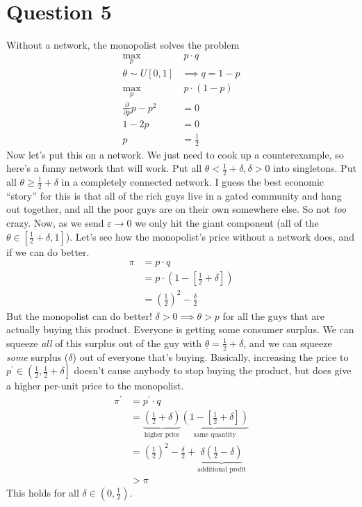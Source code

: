 \section*{Question 5}
Without a network, the monopolist solves the problem
\begin{align*}
  \max_{p} &\ p \cdot q \tag{Assume $mc = 0$}\\
  \theta \sim U[0, 1] &\implies q  = 1 - p\\
  \max_p &\ p \cdot (1 - p)\\
  \frac{\partial}{\partial p} p - p^2 &= 0 \tag{FOC}\\
  1 - 2p &= 0\\
  p &= \frac{1}{2}
\end{align*}
Now let's put this on a network. We just need to cook up a counterexample, so here's a funny network that will work. Put all $\theta < \frac{1}{2} + \delta, \delta > 0$ into singletons. Put all $\theta \ge \frac{1}{2} + \delta$ in a completely connected network. I guess the best economic ``story'' for this is that all of the rich guys live in a gated community and hang out together, and all the poor guys are on their own somewhere else. So not \emph{too} crazy. Now, as we send $\varepsilon \to 0$ we only hit the giant component (all of the $\theta \in \left[\frac{1}{2} + \delta, 1\right]$). Let's see how the monopolist's price without a network does, and if we can do better.
\begin{align*}
  \pi &= p \cdot q\\
      &= p \cdot \left(1 - \left[\frac{1}{2} + \delta\right]\right)\\
  &= \left(\frac{1}{2}\right)^2 - \frac{\delta}{2}
\end{align*}
But the monopolist can do better! $\delta > 0 \implies \theta > p $ for all the guys that are actually buying this product. Everyone is getting some consumer surplus. We can squeeze \emph{all} of this surplus out of the guy with $\underline{\theta} = \frac{1}{2} + \delta$, and we can squeeze \emph{some} surplus ($\delta$) out of everyone that's buying. Basically, increasing the price to $p^\prime \in \left(\frac{1}{2}, \frac{1}{2} + \delta\right]$ doesn't cause anybody to stop buying the product, but does give a higher per-unit price to the monopolist.
\begin{align*}
  \pi^\prime &= p^\prime \cdot q\\
             &= \underbrace{\left(\frac{1}{2} + \delta\right)}_{\text{higher price}} \underbrace{\left(1 - \left[\frac{1}{2} + \delta\right]\right)}_{\text{same quantity}}\\
             &= \left(\frac{1}{2}\right)^2 - \frac{\delta}{2} + \underbrace{\delta \left(\frac{1}{2} - \delta\right)}_{\text{additional profit}}\\
  &> \pi
\end{align*}
This holds for all $\delta \in \left(0, \frac{1}{2}\right)$.

